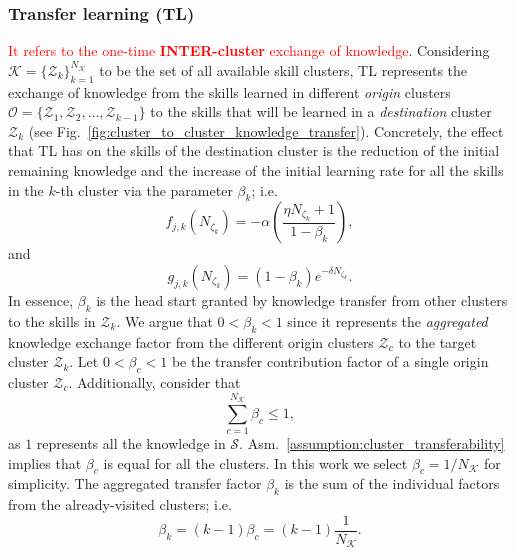 \subsubsection{\textbf{Transfer learning (TL)}}
\textcolor{red}{It refers to the one-time \textbf{INTER-cluster} exchange of knowledge}. Considering $\mathcal{K} = \{ \mathcal{Z}_k \}^{N_\mathcal{K}}_{k=1}$ to be the set of all available skill clusters, TL represents the exchange of knowledge from the skills learned in different \emph{origin} clusters $\mathcal{O} = \{ \mathcal{Z}_1,\mathcal{Z}_2,\ldots,\mathcal{Z}_{k-1} \}$ to the skills that will be learned in a \emph{destination} cluster $\mathcal{Z}_k$ (see Fig.~\ref{fig:cluster_to_cluster_knowledge_transfer}). Concretely, the effect that TL has on the skills of the destination cluster is the reduction of the initial remaining knowledge and the increase of the initial learning rate for all the skills in the $k$-th cluster via the parameter $\beta_k$; i.e.
\begin{equation}\label{eq:f_function_transfer}
	f_{j,k}\left(N_{\zeta_k}\right) = -\alpha \left( \frac{\eta N_{\zeta_k} + 1}{1 - \beta_k} \right),
\end{equation}
and
\begin{equation}\label{eq:g_function_transfer}
	g_{j,k}\left(N_{\zeta_k}\right) = (1-\beta_k) e^{-\delta N_{\zeta_k}}.
\end{equation}
In essence, $\beta_k$ is the head start granted by knowledge transfer from other clusters to the skills in $\mathcal{Z}_k$. We argue that  $0<\beta_{k} < 1$ since it represents the \emph{aggregated} knowledge exchange factor from the different origin clusters $\mathcal{Z}_{c}$ to the target cluster $\mathcal{Z}_{k}$. Let $0<\beta_{c} < 1$ be the transfer contribution factor of a single origin cluster $\mathcal{Z}_c$. Additionally, consider that
\begin{equation}
	\sum\limits_{c=1}^{N_\mathcal{K}}\beta_{c} \leq 1,
\end{equation}
as $1$ represents all the knowledge in $\mathcal{S}$. Asm.~\ref{assumption:cluster_transferability} implies that $\beta_c$ is equal for all the clusters. In this work we select $\beta_c = 1/N_\mathcal{K}$ for simplicity. The aggregated transfer factor $\beta_k$ is the sum of the individual factors from the already-visited clusters; i.e.
\begin{equation}
	\beta_{k}= \left(k-1\right)\beta_c = \left(k-1\right)\frac{1}{N_\mathcal{K}}.
\end{equation}

